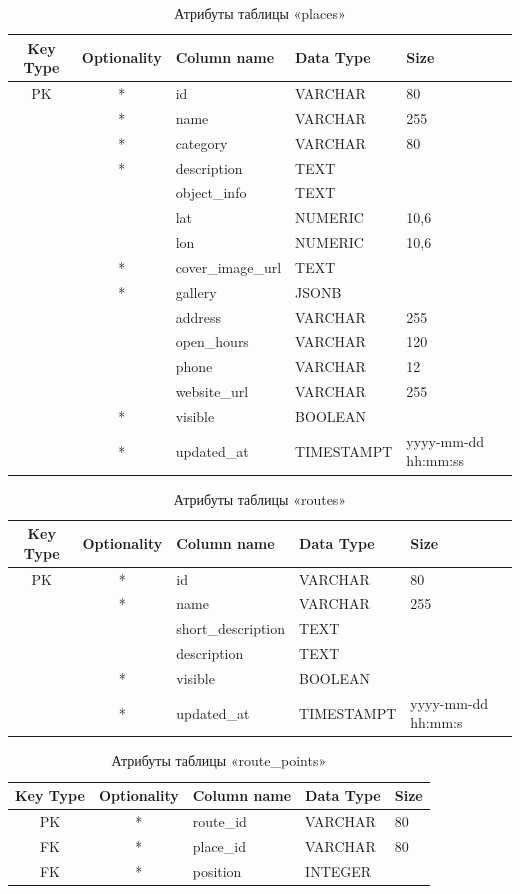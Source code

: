 \begin{xltabular}{\textwidth}{|c|c|l|l|X|}
	\caption{Атрибуты таблицы «places»}
	\label{tab:places}
	\finishhead
	\hline
	Key Type & Optionality & Column name & Data Type & Size \\ \hline
	PK & * & id & VARCHAR & 80 \\ \hline
	& * & name & VARCHAR & 255 \\ \hline
	& * & category & VARCHAR & 80 \\ \hline
	& * & description & TEXT &  \\ \hline
	&  & object\_info & TEXT & \\ \hline
	&  & lat & NUMERIC & 10,6 \\ \hline
	&  & lon & NUMERIC & 10,6 \\ \hline
	& * & cover\_image\_url & TEXT &  \\ \hline
	& * & gallery & JSONB &  \\ \hline
	&  & address & VARCHAR & 255 \\ \hline
	&  & open\_hours & VARCHAR & 120 \\ \hline
	&  & phone & VARCHAR & 12 \\ \hline
	&  & website\_url & VARCHAR & 255 \\ \hline
	& * & visible & BOOLEAN & \\ \hline
	& * & updated\_at & TIMESTAMPT & yyyy-mm-dd
	hh:mm:ss \\ \hline
\end{xltabular}

\begin{xltabular}{\textwidth}{|c|c|l|l|X|}
	\caption{Атрибуты таблицы «routes»}
	\label{tab:routes}
	\finishhead
	\hline
	Key Type & Optionality & Column name & Data Type & Size \\ \hline
	PK & * & id & VARCHAR & 80 \\ \hline
	& * & name & VARCHAR & 255 \\ \hline
	&   & short\_description & TEXT &  \\ \hline
	&   & description & TEXT &  \\ \hline
	& * & visible & BOOLEAN & \\ \hline
	& * & updated\_at & TIMESTAMPT & yyyy-mm-dd
	hh:mm:s \\ \hline
\end{xltabular}

\begin{xltabular}{\textwidth}{|c|c|l|l|X|}
	\caption{Атрибуты таблицы «route\_points»}
	\label{tab:route-points}
	\finishhead
	\hline
	Key Type & Optionality & Column name & Data Type & Size \\ \hline
	PK & * & route\_id & VARCHAR & 80 \\ \hline
	FK & * & place\_id & VARCHAR & 80 \\ \hline
	FK & * & position & INTEGER &  \\ \hline
\end{xltabular}

